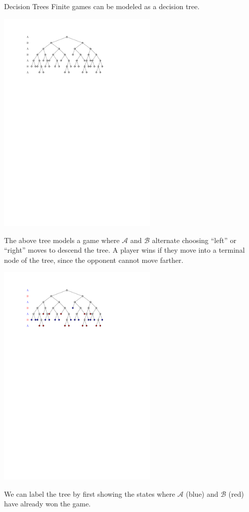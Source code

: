 \documentclass{beamer}
\theoremstyle{theorem}
\theoremstyle{definition}
\newcommand{\<}{\langle}
\renewcommand{\>}{\rangle}
\newcommand{\pl}[1]{\mathscr{#1}}
\begin{document}
\begin{frame}{Decision Trees}
  Finite games can be modeled as a decision tree.

  \centerline{\includegraphics[width=3in]{decisionTree1.pdf}}

  The above tree models a game where $\pl A$ and $\pl B$ alternate choosing
  ``left'' or ``right'' moves to descend the tree. A player wins if they
  move into a terminal node of the tree, since the opponent cannot move farther.
\end{frame}

\begin{frame}
  \centerline{\includegraphics[width=3in]{decisionTree2.pdf}}

  \vspace{1em}

  We can label the tree by first showing the states where $\pl A$ (blue) and
  $\pl B$ (red) have already won the game.
\end{frame}
\end{document}
